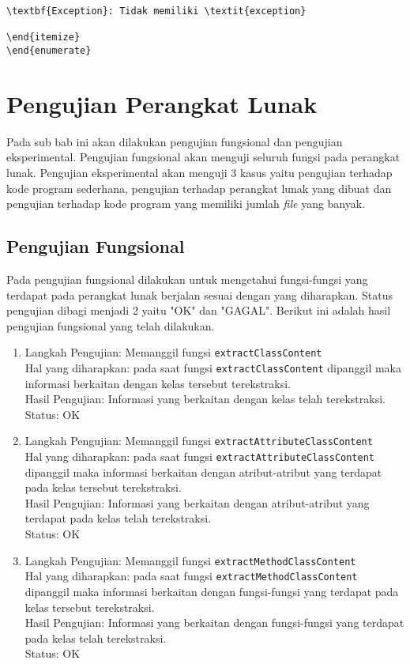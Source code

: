 \begin{lstlisting}[caption=Hasil Implementasi]
\textbf{Exception}: Tidak memiliki \textit{exception}

\end{itemize}
\end{enumerate}

\end{lstlisting}

\section{Pengujian Perangkat Lunak}
\label{sec: pengujian perangkat lunak}
Pada sub bab ini akan dilakukan pengujian fungsional dan pengujian eksperimental. Pengujian fungsional akan menguji seluruh fungsi pada perangkat lunak. Pengujian eksperimental akan menguji 3 kasus yaitu pengujian terhadap kode program sederhana, pengujian terhadap perangkat lunak yang dibuat dan pengujian terhadap kode program yang memiliki jumlah {\it file} yang banyak.
\subsection{Pengujian Fungsional}
\label{sec:pengujian fungsional}
Pada pengujian fungsional dilakukan untuk mengetahui fungsi-fungsi yang terdapat pada perangkat lunak berjalan sesuai dengan yang diharapkan. Status pengujian dibagi menjadi 2 yaitu "OK" dan "GAGAL". Berikut ini adalah hasil pengujian fungsional yang telah dilakukan.
\begin{enumerate}
	\item Langkah Pengujian: Memanggil fungsi \texttt{extractClassContent}\\
	Hal yang diharapkan: pada saat fungsi \texttt{extractClassContent} dipanggil maka informasi berkaitan dengan kelas tersebut terekstraksi.\\
	Hasil Pengujian: Informasi yang berkaitan dengan kelas telah terekstraksi.\\
	Status: OK
	\item Langkah Pengujian: Memanggil fungsi \texttt{extractAttributeClassContent}\\
	Hal yang diharapkan: pada saat fungsi \texttt{extractAttributeClassContent} dipanggil maka informasi berkaitan dengan atribut-atribut yang terdapat pada kelas tersebut terekstraksi.\\
	Hasil Pengujian: Informasi yang berkaitan dengan atribut-atribut yang terdapat pada kelas telah terekstraksi.\\
	Status: OK
	\item Langkah Pengujian: Memanggil fungsi \texttt{extractMethodClassContent}\\
	Hal yang diharapkan: pada saat fungsi \texttt{extractMethodClassContent} dipanggil maka informasi berkaitan dengan fungsi-fungsi yang terdapat pada kelas tersebut terekstraksi.\\
	Hasil Pengujian: Informasi yang berkaitan dengan fungsi-fungsi yang terdapat pada kelas telah terekstraksi.\\
	Status: OK
\end{enumerate}

